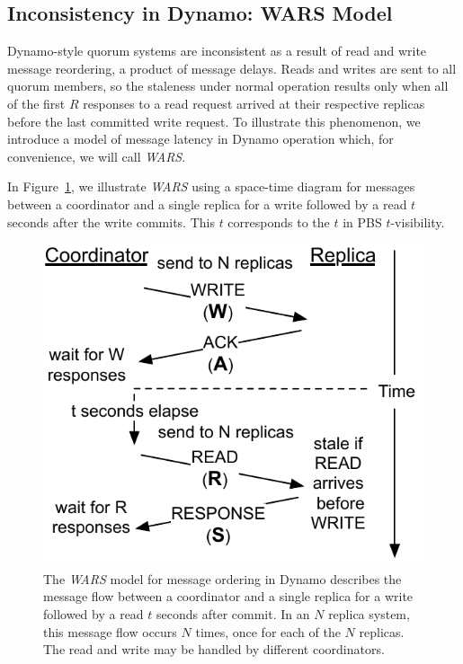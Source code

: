 \documentclass{vldb}
\newcommand{\subsectionskip}{-0em}
\begin{document}
\vspace{\subsectionskip}\subsection{Inconsistency in Dynamo: WARS Model}
\label{sec:wars}

Dynamo-style quorum systems are inconsistent as a result of read and
write message reordering, a product of message delays.  Reads and
writes are sent to all quorum members, so the staleness under normal
operation results only when all of the first $R$ responses to a read
request arrived at their respective replicas before the last committed
write request.  To illustrate this phenomenon, we introduce a model
of message latency in Dynamo operation which, for convenience, we will
call \textit{WARS}.

In Figure~\ref{fig:dynamo-diagram}, we illustrate \textit{WARS} using
a space-time diagram for messages between a coordinator and a single
replica for a write followed by a read $t$ seconds after the write
commits.  This $t$ corresponds to the $t$ in PBS $t$-visibility.

\begin{figure}
\centering
\includegraphics[width=.7\columnwidth]{figs/dynamostale.pdf}
\vspace{-8pt}
\caption{The \textit{WARS} model for message ordering in Dynamo
  describes the message flow between a coordinator and a single
  replica for a write followed by a read $t$ seconds after commit.  In
  an $N$ replica system, this message flow occurs $N$ times, once for
  each of the $N$ replicas.  The read and write may be handled by
  different coordinators.}
\vspace{-12pt}
\label{fig:dynamo-diagram}
\end{figure}
\end{document}
